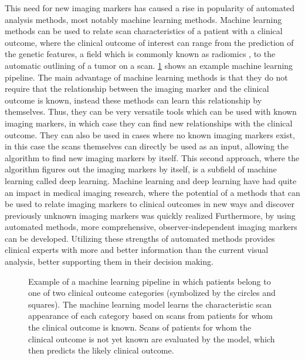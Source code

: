 This need for new imaging markers has caused a rise in popularity of automated analysis methods, most notably machine learning methods.
Machine learning methods can be used to relate scan characteristics of a patient with a clinical outcome, where the clinical outcome of interest can range from the prediction of the genetic features, a field which is commonly known as radiomics \autocite{lambin2012radiomics}, to the automatic outlining of a \gls{tumor} on a scan.
\cref{fig:intro_example_ml} shows an example machine learning pipeline.
The main advantage of machine learning methods is that they do not require that the relationship between the imaging marker and the clinical outcome is known, instead these methods can learn this relationship by themselves.
Thus, they can be very versatile tools which can be used with known imaging markers, in which case they can find new relationships with the clinical outcome.
They can also be used in cases where no known imaging markers exist, in this case the scans themselves can directly be used as an input, allowing the algorithm to find new imaging markers by itself.
This second approach, where the algorithm figures out the imaging markers by itself, is a subfield of machine learning called deep learning.
Machine learning and deep learning have had quite an impact in medical imaging research, where the potential of a methods that can be used to relate imaging markers to clinical outcomes in new ways and discover previously unknown imaging markers was quickly realized \autocite{june2017deep, gillies2016radiomics}
Furthermore, by using automated methods, more comprehensive, observer-independent imaging markers can be developed.
Utilizing these strengths of automated methods provides clinical experts with more and better information than the current visual analysis, better supporting them in their decision making.


\begin{figure}[htbp]
    \centering
    \caption{Example of a machine learning pipeline in which patients belong to one of two clinical outcome categories (symbolized by the circles and squares).
    The machine learning model learns the characteristic scan appearance of each category based on scans from patients for whom the clinical outcome is known.
    Scans of patients for whom the clinical outcome is not yet known are evaluated by the model, which then predicts the likely clinical outcome.}\label{fig:intro_example_ml}
\end{figure}


